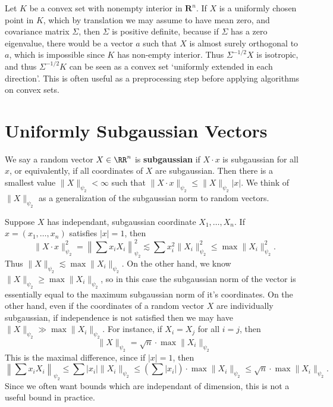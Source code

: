 \begin{example}
    Let $K$ be a convex set with nonempty interior in $\mathbf{R}^n$. If $X$ is a uniformly chosen point in $K$, which by translation we may assume to have mean zero, and covariance matrix $\Sigma$, then $\Sigma$ is positive definite, because if $\Sigma$ has a zero eigenvalue, there would be a vector $a$ such that $X$ is almost surely orthogonal to $a$, which is impossible since $K$ has non-empty interior. Thus $\Sigma^{-1/2} X$ is isotropic, and thus $\Sigma^{-1/2} K$ can be seen as a convex set `uniformly extended in each direction'. This is often useful as a preprocessing step before applying algorithms on convex sets.
\end{example}

\section{Uniformly Subgaussian Vectors}

We say a random vector $X \in \RR^n$ is \textbf{subgaussian} if $X \cdot x$ is subgaussian for all $x$, or equivalently, if all coordinates of $X$ are subgaussian. Then there is a smallest value $\| X \|_{\psi_2} < \infty$ such that $\| X \cdot x \|_{\psi_2} \leq \| X \|_{\psi_2} |x|$. We think of $\| X \|_{\psi_2}$ as a generalization of the subgaussian norm to random vectors.

\begin{example}
    Suppose $X$ has independant, subgaussian coordinate $X_1, \dots, X_n$. If $x = (x_1, \dots, x_n)$ satisfies $|x| = 1$, then
    \[ \| X \cdot x \|_{\psi_2}^2 = \left\| \sum x_i X_i \right\|_{\psi_2}^2 \lesssim \sum x_i^2 \| X_i \|_{\psi_2}^2 \leq \max \| X_i \|_{\psi_2}^2. \]
    Thus $\| X \|_{\psi_2} \lesssim \max \| X_i \|_{\psi_2}$. On the other hand, we know $\| X \|_{\psi_2} \geq \max \| X_i \|_{\psi_2}$, so in this case the subgaussian norm of the vector is essentially equal to the maximum subgaussian norm of it's coordinates. On the other hand, even if the coordinates of a random vector $X$ are individually subgaussian, if independence is not satisfied then we may have $\| X \|_{\psi_2} \gg \max \| X_i \|_{\psi_2}$. For instance, if $X_i = X_j$ for all $i = j$, then
    \[ \| X \|_{\psi_2} = \sqrt{n} \cdot \max \| X_i \|_{\psi_2} \]
    This is the maximal difference, since if $|x| = 1$, then
    \[ \left\| \sum x_i X_i \right\|_{\psi_2} \leq \sum |x_i| \| X_i \|_{\psi_2} \leq \left( \sum |x_i| \right) \cdot \max \| X_i \|_{\psi_2} \leq \sqrt{n} \cdot \max \| X_i \|_{\psi_2}. \]
    Since we often want bounds which are independant of dimension, this is not a useful bound in practice.
\end{example}

